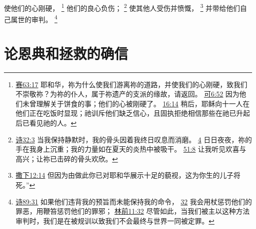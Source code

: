 \documentclass[12pt, a4paper, oneside]{ctexart}
\begin{document}
	使他们的心刚硬，
	\footnote {
		\href{https://biblehub.com/isaiah/63-17.htm}{赛63:17} 耶和华，祢为什么使我们游离祢的道路，并使我们的心刚硬，致我们不崇敬祢？为祢的仆人，属于祢遗产的支派的缘故，请返回。
		\href{https://biblehub.com/mark/6-52.htm}{可6:52} 因为他们未曾理解关于饼食的事；他们的心被刚硬了。
		\href{https://biblehub.com/mark/16-14.htm}{16:14} 稍后，耶稣向十一人在他们正在吃饭时显现；祂训斥他们缺乏信心，且固执拒绝相信那些在祂已升起后已看见祂的人。
	}
	他们的良心负伤；
	\footnote {
		\href{https://biblehub.com/psalms/32-3.htm}{诗32:3} 当我保持静默时，我的骨头因着我终日叹息而消磨。
		\href{https://biblehub.com/psalms/32-4.htm}{4} 日日夜夜，祢的手在我身上沉重；我的力量如在夏天的炎热中被吸干。
		\href{https://biblehub.com/psalms/51-8.htm}{51:8} 让我听见欢喜与高兴；让祢已击碎的骨头欢欣。
	}
	使其他人受伤并愤慨，
	\footnote {
		\href{https://biblehub.com/2_samuel/12-14.htm}{撒下12:14} 但因为由做此你已对耶和华展示十足的藐视，这为你生的儿子将死。”
	}
	并带给他们自己属世的审判。
	\footnote {
		\href{https://biblehub.com/psalms/89-31.htm}{诗89:31} 如果他们违背我的预旨而未能保持我的命令，
		\href{https://biblehub.com/psalms/89-32.htm}{32} 我会用杖惩罚他们的罪恶，用鞭笞惩罚他们的罪邪；
		\href{https://biblehub.com/1_corinthians/11-32.htm}{林前11:32} 尽管如此，当我们被主以这种方法审判时，我们是在被规训以致我们不会最终与世界一同被定罪。
	}

\section{论恩典和拯救的确信}
\end{document}
